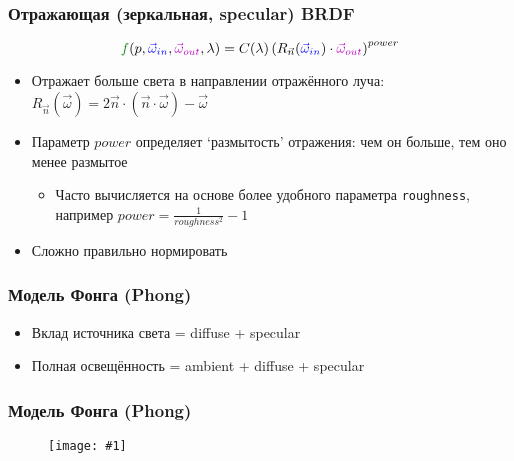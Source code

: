 \documentclass{beamer}
\newcommand{\slideimage}[1]{
  \begin{figure}
    \begin{adjustbox}{width=\textwidth, totalheight=\textheight-2\baselineskip-2\baselineskip,keepaspectratio}
      \texttt{[image: \#1]}
    \end{adjustbox}
  \end{figure}
}
\begin{document}
\begin{frame}[fragile]
\frametitle{Отражающая (зеркальная, specular) BRDF}
\begin{equation*}
{\color{green}f}(p, {\color{blue}\vec\omega_{in}}, {\color{magenta}\vec\omega_{out}}, \lambda) = C(\lambda) \left(R_{\vec n}({\color{blue}\vec\omega_{in}})\cdot{\color{magenta}\vec\omega_{out}}\right)^{power}
\end{equation*}
\begin{itemize}
\item Отражает больше света в направлении отражённого луча: \begin{math}R_{\vec n}(\vec \omega) = 2\vec n \cdot (\vec n \cdot \vec \omega) - \vec \omega\end{math}
\item Параметр \begin{math}power\end{math} определяет `размытость' отражения: чем он больше, тем оно менее размытое
\begin{itemize}
\item Часто вычисляется на основе более удобного параметра \verb|roughness|, например \begin{math}power = \frac{1}{roughness^2}-1\end{math}
\end{itemize}
\item Сложно правильно нормировать
\end{itemize}
\end{frame}

\begin{frame}[fragile]
\frametitle{Модель Фонга (Phong)}
\begin{itemize}
\item Вклад источника света = diffuse + specular
\pause
\item Полная освещённость = ambient + diffuse + specular
\end{itemize}
\end{frame}

\begin{frame}[fragile]
\frametitle{Модель Фонга (Phong)}
\slideimage{phong.png}
\end{frame}
\end{document}
